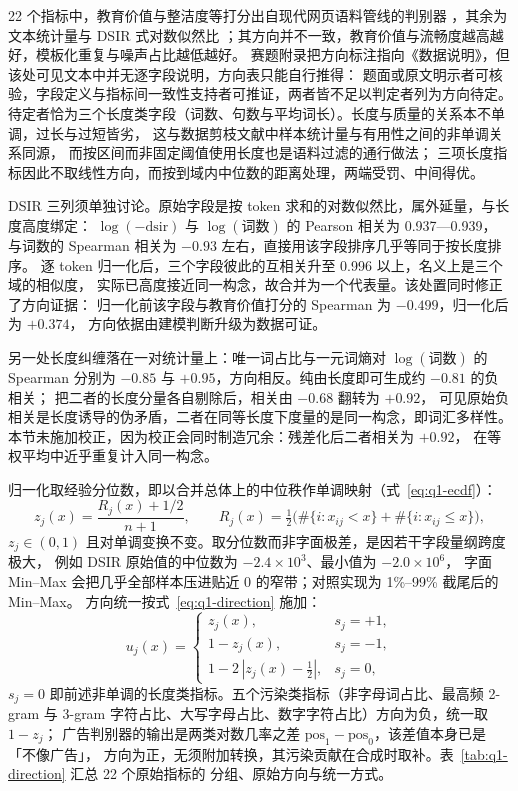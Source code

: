 22 个指标中，教育价值与整洁度等打分出自现代网页语料管线的判别器
\citep{penedo2024fineweb,warner2024modernbert}，其余为文本统计量与 DSIR 式对数似然比
\citep{xie2023dsir}；其方向并不一致，教育价值与流畅度越高越好，模板化重复与噪声占比越低越好。
赛题附录把方向标注指向《数据说明》，但该处可见文本中并无逐字段说明，方向表只能自行推得：
题面或原文明示者可核验，字段定义与指标间一致性支持者可推证，两者皆不足以判定者列为方向待定。
待定者恰为三个长度类字段（词数、句数与平均词长）。长度与质量的关系本不单调，过长与过短皆劣，
这与数据剪枝文献中样本统计量与有用性之间的非单调关系同源\citep{sorscher2022}，
而按区间而非固定阈值使用长度也是语料过滤的通行做法\citep{rae2021gopher}；
三项长度指标因此不取线性方向，而按到域内中位数的距离处理，两端受罚、中间得优。

DSIR 三列须单独讨论。原始字段是按 token 求和的对数似然比，属外延量，与长度高度绑定：
$\log(-\text{dsir})$ 与 $\log(\text{词数})$ 的 Pearson 相关为 0.937—0.939，
与词数的 Spearman 相关为 $-0.93$ 左右，直接用该字段排序几乎等同于按长度排序。
逐 token 归一化后，三个字段彼此的互相关升至 0.996 以上，名义上是三个域的相似度，
实际已高度接近同一构念，故合并为一个代表量。该处置同时修正了方向证据：
归一化前该字段与教育价值打分的 Spearman 为 $-0.499$，归一化后为 $+0.374$，
方向依据由建模判断升级为数据可证。

另一处长度纠缠落在一对统计量上：唯一词占比与一元词熵对 $\log(\text{词数})$ 的 Spearman
分别为 $-0.85$ 与 $+0.95$，方向相反。纯由长度即可生成约 $-0.81$ 的负相关；
把二者的长度分量各自剔除后，相关由 $-0.68$ 翻转为 $+0.92$，
可见原始负相关是长度诱导的伪矛盾，二者在同等长度下度量的是同一构念，即词汇多样性。
本节未施加校正，因为校正会同时制造冗余：残差化后二者相关为 $+0.92$，
在等权平均中近乎重复计入同一构念。

归一化取经验分位数，即以合并总体上的中位秩作单调映射（式~\eqref{eq:q1-ecdf}）：
\begin{equation}
  z_j(x)=\frac{R_j(x)+1/2}{n+1},\qquad
  R_j(x)=\tfrac{1}{2}\bigl(\#\{i:x_{ij}<x\}+\#\{i:x_{ij}\le x\}\bigr),
  \label{eq:q1-ecdf}
\end{equation}
$z_j\in(0,1)$ 且对单调变换不变。取分位数而非字面极差，是因若干字段量纲跨度极大，
例如 DSIR 原始值的中位数为 $-2.4\times10^{3}$、最小值为 $-2.0\times10^{6}$，
字面 Min--Max 会把几乎全部样本压进贴近 0 的窄带；对照实现为 1\%--99\% 截尾后的 Min--Max。
方向统一按式~\eqref{eq:q1-direction} 施加：
\begin{equation}
  u_j(x)=
  \begin{cases}
    z_j(x), & s_j=+1,\\
    1-z_j(x), & s_j=-1,\\
    1-2\,|z_j(x)-\tfrac{1}{2}|, & s_j=0,
  \end{cases}
  \label{eq:q1-direction}
\end{equation}
$s_j=0$ 即前述非单调的长度类指标。五个污染类指标（非字母词占比、最高频 2-gram 与 3-gram
字符占比、大写字母占比、数字字符占比）方向为负，统一取 $1-z_j$；
广告判别器的输出是两类对数几率之差 $\text{pos}_1-\text{pos}_0$，该差值本身已是「不像广告」，
方向为正，无须附加转换，其污染贡献在合成时取补。表~\ref{tab:q1-direction} 汇总 22 个原始指标的
分组、原始方向与统一方式。

